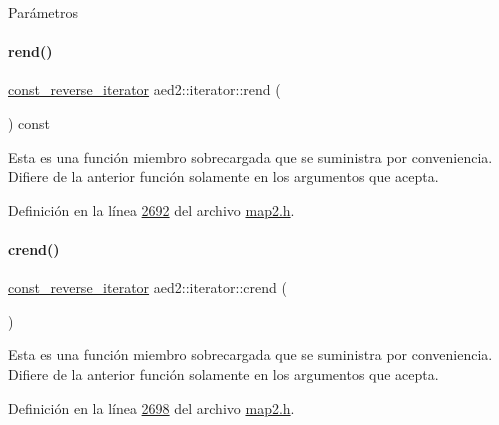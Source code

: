 \begin{DoxyParams}{\-Parámetros}
\begin{DoxyCompactItemize}
\paragraph{\texorpdfstring{rend()}{rend()}\hspace{0.1cm}{\footnotesize\ttfamily [2/2]}}
{\footnotesize\ttfamily \hyperlink{classaed2_1_1iterator_a657402896e5b5966660032f5686cc4c4_a657402896e5b5966660032f5686cc4c4}{const\+\_\+reverse\+\_\+iterator} aed2\+::iterator\+::rend (\begin{DoxyParamCaption}{ }\end{DoxyParamCaption}) const\hspace{0.3cm}{\ttfamily [inline]}}

Esta es una función miembro sobrecargada que se suministra por conveniencia. Difiere de la anterior función solamente en los argumentos que acepta. 

Definición en la línea \hyperlink{map2_8h_source_l02692}{2692} del archivo \hyperlink{map2_8h_source}{map2.\+h}.

\mbox{\label{classaed2_1_1iterator_a2e31ad7ded06c666c6c37c5d30bb41af_a2e31ad7ded06c666c6c37c5d30bb41af}} 
\paragraph{\texorpdfstring{crend()}{crend()}}
{\footnotesize\ttfamily \hyperlink{classaed2_1_1iterator_a657402896e5b5966660032f5686cc4c4_a657402896e5b5966660032f5686cc4c4}{const\+\_\+reverse\+\_\+iterator} aed2\+::iterator\+::crend (\begin{DoxyParamCaption}{ }\end{DoxyParamCaption})\hspace{0.3cm}{\ttfamily [inline]}}

Esta es una función miembro sobrecargada que se suministra por conveniencia. Difiere de la anterior función solamente en los argumentos que acepta. 

Definición en la línea \hyperlink{map2_8h_source_l02698}{2698} del archivo \hyperlink{map2_8h_source}{map2.\+h}.

\mbox{\label{classaed2_1_1iterator_aa442801bed510f7fde94e14bafada8a1_aa442801bed510f7fde94e14bafada8a1}} 

\end{DoxyCompactItemize}
\end{DoxyParams}
